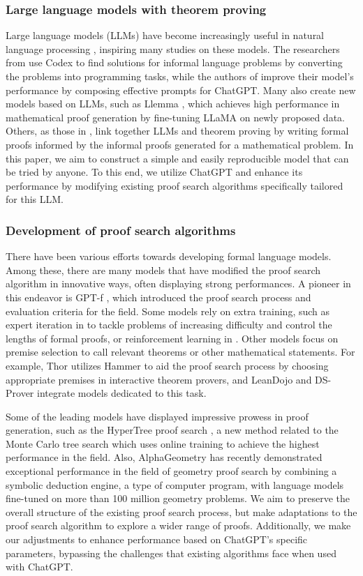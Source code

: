 \subsubsection{Large language models with theorem proving}
Large language models (LLMs) have become increasingly useful in natural language processing \cite{gpt4,gpt3,codex,palm,llama}, inspiring many studies on these models.
The researchers from \cite{MIT} use Codex to find solutions for informal language problems by converting the problems into programming tasks, while the authors of \cite{copra} improve their model's performance by composing effective prompts for ChatGPT.
Many also create new models based on LLMs, such as Llemma \cite{llemma}, which achieves high performance in mathematical proof generation by fine-tuning LLaMA \cite{llama} on newly proposed data.
Others, as those in \cite{DraftSketchProve,lego}, link together LLMs and theorem proving by writing formal proofs informed by the informal proofs generated for a mathematical problem.
In this paper, we aim to construct a simple and easily reproducible model that can be tried by anyone.
To this end, we utilize ChatGPT and enhance its performance by modifying existing proof search algorithms specifically tailored for this LLM.

\subsubsection{Development of proof search algorithms}
There have been various efforts towards developing formal language models. Among these, there are many models that have modified the proof search algorithm in innovative ways, often displaying strong performances. A pioneer in this endeavor is GPT-f \cite{GPTf}, which introduced the proof search process and evaluation criteria for the field. 
Some models rely on extra training, such as expert iteration in \cite{curriculum} to tackle problems of increasing difficulty and control the lengths of formal proofs, or reinforcement learning in \cite{TacticZero}.
Other models focus on premise selection to call relevant theorems or other mathematical statements. For example, Thor \cite{thor} utilizes Hammer to aid the proof search process by choosing appropriate premises in interactive theorem provers, and LeanDojo \cite{leandojo} and DS-Prover \cite{ds-prover} integrate models dedicated to this task.

Some of the leading models have displayed impressive prowess in proof generation, such as the HyperTree proof search \cite{HyperTree}, a new method related to the Monte Carlo tree search which uses online training to achieve the highest performance in the field.
Also, AlphaGeometry \cite{alphageometry} has recently demonstrated exceptional performance in the field of geometry proof search by combining a symbolic deduction engine, a type of computer program, with language models fine-tuned on more than 100 million geometry problems. 
We aim to preserve the overall structure of the existing proof search process, but make adaptations to the proof search algorithm to explore a wider range of proofs. Additionally, we make our adjustments to enhance performance based on ChatGPT's specific parameters, bypassing the challenges that existing algorithms face when used with ChatGPT.